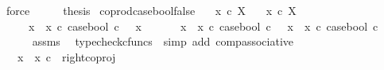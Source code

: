 \begin{isabellebody}
\ force\isanewline
\ \ \isamarkupfalse%
\ \isamarkupfalse%
\ {\isacharquery}{\kern0pt}thesis\isacommand{{\isachardot}{\kern0pt}}\isamarkupfalse%
\isanewline
{}\isamarkupfalse%
%
\endisatagproof
{\isafoldproof}%
%
\isadelimproof
\isanewline
%
\endisadelimproof
\isanewline
{}\isamarkupfalse%
\ coprod{\isacharunderscore}{\kern0pt}case{\isacharunderscore}{\kern0pt}bool{\isacharunderscore}{\kern0pt}false{\isacharcolon}{\kern0pt}\isanewline
\ \ \ {\isachardoublequoteopen}x{}\ {\isasymin}\isactrlsub c\ X{\isachardoublequoteclose}\isanewline
\ \ \ {\isachardoublequoteopen}x{}\ {\isasymin}\isactrlsub c\ X{\isachardoublequoteclose}\isanewline
\ \ \ \ \ {\isachardoublequoteopen}{\isacharparenleft}{\kern0pt}x{}\ {\isasymamalg}\ x{}\ {\isasymcirc}\isactrlsub c\ case{\isacharunderscore}{\kern0pt}bool{\isacharparenright}{\kern0pt}\ {\isasymcirc}\isactrlsub c\ {\isasymf}\ {\isacharequal}{\kern0pt}\ x{}{\isachardoublequoteclose}\isanewline
%
\isadelimproof
%
\endisadelimproof
%
\isatagproof
{}\isamarkupfalse%
\ {\isacharminus}{\kern0pt}\ \isanewline
\ \ \isamarkupfalse%
\ {\isachardoublequoteopen}{\isacharparenleft}{\kern0pt}x{}\ {\isasymamalg}\ x{}\ {\isasymcirc}\isactrlsub c\ case{\isacharunderscore}{\kern0pt}bool{\isacharparenright}{\kern0pt}\ {\isasymcirc}\isactrlsub c\ {\isasymf}\ {\isacharequal}{\kern0pt}\ {\isacharparenleft}{\kern0pt}x{}\ {\isasymamalg}\ x{}{\isacharparenright}{\kern0pt}\ {\isasymcirc}\isactrlsub c\ case{\isacharunderscore}{\kern0pt}bool\ {\isasymcirc}\isactrlsub c\ {\isasymf}{\isachardoublequoteclose}\isanewline
\ \ \ \ \isamarkupfalse%
\ assms\ \isamarkupfalse%
\ {\isacharparenleft}{\kern0pt}typecheck{\isacharunderscore}{\kern0pt}cfuncs\ {\isacharcomma}{\kern0pt}\ simp\ add{\isacharcolon}{\kern0pt}\ comp{\isacharunderscore}{\kern0pt}associative{}{\isacharparenright}{\kern0pt}\isanewline
\ \ \isamarkupfalse%
\ \isamarkupfalse%
\ {\isachardoublequoteopen}{\isachardot}{\kern0pt}{\isachardot}{\kern0pt}{\isachardot}{\kern0pt}\ {\isacharequal}{\kern0pt}\ {\isacharparenleft}{\kern0pt}x{}\ {\isasymamalg}\ x{}{\isacharparenright}{\kern0pt}\ {\isasymcirc}\isactrlsub c\ \ right{\isacharunderscore}{\kern0pt}coproj\ {\isasymone}\ {\isasymone}{\isachardoublequoteclose}\isanewline
\ \ \ \ \isamarkupfalse%

\end{isabellebody}
